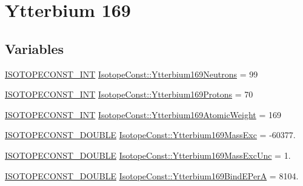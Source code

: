 \hypertarget{group___isotope_const-_ytterbium-_yb169}{}\section{Ytterbium 169}
\label{group___isotope_const-_ytterbium-_yb169}
\subsection*{Variables}
\begin{DoxyCompactItemize}
\item 
\mbox{\hyperlink{group___isotope_const-_macros_ga5f18360b3e99483a35c32d789e62621c}{I\+S\+O\+T\+O\+P\+E\+C\+O\+N\+S\+T\+\_\+\+I\+NT}} \mbox{\hyperlink{group___isotope_const-_ytterbium-_yb169_ga622e5c8bcc35554985fc73c25d8686c7}{Isotope\+Const\+::\+Ytterbium169\+Neutrons}} = 99
\item 
\mbox{\hyperlink{group___isotope_const-_macros_ga5f18360b3e99483a35c32d789e62621c}{I\+S\+O\+T\+O\+P\+E\+C\+O\+N\+S\+T\+\_\+\+I\+NT}} \mbox{\hyperlink{group___isotope_const-_ytterbium-_yb169_ga421bb03f4de55b9067b25f67591bdd4f}{Isotope\+Const\+::\+Ytterbium169\+Protons}} = 70
\item 
\mbox{\hyperlink{group___isotope_const-_macros_ga5f18360b3e99483a35c32d789e62621c}{I\+S\+O\+T\+O\+P\+E\+C\+O\+N\+S\+T\+\_\+\+I\+NT}} \mbox{\hyperlink{group___isotope_const-_ytterbium-_yb169_gafb1c5eeac1d4f0df6bae0eadcb539f8f}{Isotope\+Const\+::\+Ytterbium169\+Atomic\+Weight}} = 169
\item 
\mbox{\hyperlink{group___isotope_const-_macros_ga8f45a7272ce02c0b4c65c44636ed719a}{I\+S\+O\+T\+O\+P\+E\+C\+O\+N\+S\+T\+\_\+\+D\+O\+U\+B\+LE}} \mbox{\hyperlink{group___isotope_const-_ytterbium-_yb169_gafe0c9bc58782963cfba0a7b56a499964}{Isotope\+Const\+::\+Ytterbium169\+Mass\+Exc}} = -\/60377.
\item 
\mbox{\hyperlink{group___isotope_const-_macros_ga8f45a7272ce02c0b4c65c44636ed719a}{I\+S\+O\+T\+O\+P\+E\+C\+O\+N\+S\+T\+\_\+\+D\+O\+U\+B\+LE}} \mbox{\hyperlink{group___isotope_const-_ytterbium-_yb169_ga0ed265a3e8acb049279018407f35b13e}{Isotope\+Const\+::\+Ytterbium169\+Mass\+Exc\+Unc}} = 1.
\item 
\mbox{\hyperlink{group___isotope_const-_macros_ga8f45a7272ce02c0b4c65c44636ed719a}{I\+S\+O\+T\+O\+P\+E\+C\+O\+N\+S\+T\+\_\+\+D\+O\+U\+B\+LE}} \mbox{\hyperlink{group___isotope_const-_ytterbium-_yb169_ga2f20ce8236476d05c4ffc5e333524c1c}{Isotope\+Const\+::\+Ytterbium169\+Bind\+E\+PerA}} = 8104.
\item 

\end{DoxyCompactItemize}
